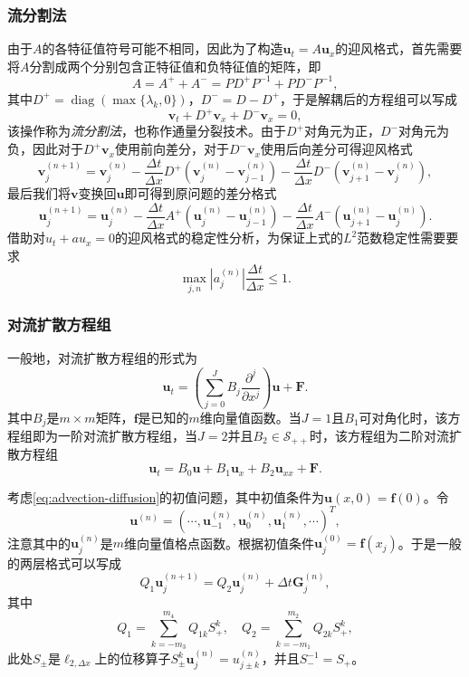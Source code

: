 \documentclass[a4paper,10pt]{ctexart}
\begin{document}
\subsubsection{流分割法}
由于$ A $的各特征值符号可能不相同，因此为了构造$ \bm{u}_t = A \bm{u}_x $的迎风格式，首先需要将$ A $分割成两个分别包含正特征值和负特征值的矩阵，即
\[
    A = A^+ + A^- = PD^+P^{-1} + PD^-P^{-1},
\]
其中$ D^{+} = \operatorname{diag}(\max\{\lambda_k,0\}) $，$ D^- = D - D^+ $，于是解耦后的方程组可以写成
\[
    \bm{v}_t + D^+\bm{v}_x + D^-\bm{v}_x = 0,
\]
该操作称为\emph{流分割法}，也称作通量分裂技术。由于$ D^+ $对角元为正，$ D^- $对角元为负，因此对于$ D^+\bm{v}_x $使用前向差分，对于$ D^-\bm{v}_x $使用后向差分可得迎风格式
\begin{equation}
    \bm{v}^{(n+1)}_j = \bm{v}^{(n)}_j - \frac{\Delta t}{\Delta x}D^+(\bm{v}^{(n)}_j-\bm{v}^{(n)}_{j-1}) - \frac{\Delta t}{\Delta x}D^-(\bm{v}^{(n)}_{j+1}-\bm{v}_{j}^{(n)}),
\end{equation}
最后我们将$ \bm{v} $变换回$ \bm{u} $即可得到原问题的差分格式
\begin{equation}
    \bm{u}^{(n+1)}_j = \bm{u}^{(n)}_j - \frac{\Delta t}{\Delta x}A^+(\bm{u}^{(n)}_j-\bm{u}^{(n)}_{j-1}) - \frac{\Delta t}{\Delta x}A^-(\bm{u}^{(n)}_{j+1}-\bm{u}_{j}^{(n)}).
\end{equation}
借助对$ u_t+au_x=0 $的迎风格式的稳定性分析，为保证上式的$ L^2 $范数稳定性需要要求
\begin{equation}
    \max_{j,n} |a_j^{(n)}| \frac{\Delta t}{\Delta x} \leqslant 1.
\end{equation}

\subsubsection{对流扩散方程组}
一般地，对流扩散方程组的形式为
\begin{equation}\label{eq:advection-diffusion}
    \bm{u}_t = \left( \sum_{j=0}^JB_j \frac{\partial^j}{\partial x^j} \right) \bm{u} + \bm{F}.
\end{equation}
其中$ B_j $是$ m\times m $矩阵，$ \bm{f} $是已知的$ m $维向量值函数。当$ J=1 $且$ B_1 $可对角化时，该方程组即为一阶对流扩散方程组，当$ J=2 $并且$ B_2\in \mathcal{S}_{++} $时，该方程组为二阶对流扩散方程组
\[
    \bm{u}_t = B_0\bm{u} + B_1 \bm{u}_x + B_2\bm{u}_{xx} + \bm{F}.  
\]

考虑\eqref{eq:advection-diffusion}的初值问题，其中初值条件为$ \bm{u}(x,0)=\bm{f}(0) $。令
\[
    \bm{u}^{(n)} = (\cdots ,\bm{u}^{(n)}_{-1}, \bm{u}^{(n)}_0, \bm{u}^{(n)}_1,\cdots )^T,
\]
注意其中的$ \bm{u}^{(n)}_j $是$ m $维向量值格点函数。根据初值条件$ \bm{u}^{(0)}_j = \bm{f}(x_j) $。于是一般的两层格式可以写成
\begin{equation}\label{eq:two-level}
    Q_1 \bm{u}^{(n+1)}_j = Q_2 \bm{u}^{(n)}_j + \Delta t \bm{G}^{(n)}_j,
\end{equation}
其中
\begin{equation}
    Q_1 = \sum_{k=-m_3}^{m_4} Q_{1k}S_+^k,\quad Q_2 = \sum_{k=-m_1}^{m_2} Q_{2k}S_+^k,
\end{equation}
此处$ S_{\pm} $是$ \ell_{2,\Delta x} $上的位移算子$ S_{\pm}^k\bm{u}_j^{(n)} = u^{(n)}_{j\pm k} $，并且$ S_-^{-1} = S_+ $。
\end{document}
